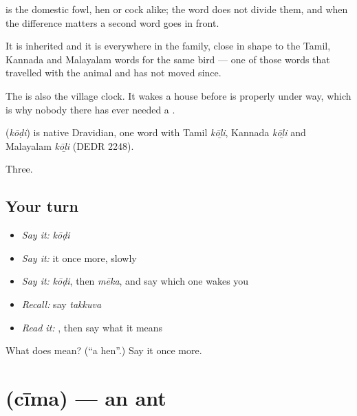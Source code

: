  is the domestic fowl, hen or cock alike; the word does not divide them, and when the difference matters a second word goes in front.

It is inherited and it is everywhere in the family, close in shape to the Tamil, Kannada and Malayalam words for the same bird — one of those words that travelled with the animal and has not moved since.

The  is also the village clock. It wakes a house before  is properly under way, which is why nobody there has ever needed a .

\begin{cousinweb}
\textbf{} (\emph{kōḍi}) is native Dravidian, one word with Tamil \emph{kōḻi}, Kannada \emph{kōḻi} and Malayalam \emph{kōḻi} (DEDR 2248).
\end{cousinweb}

\begin{grammarlens}[title={What you've built}]
Three.
\end{grammarlens}

\subsection*{Your turn}
\begin{itemize}
\raggedright
  \item \emph{Say it:} \emph{kōḍi}
  \item \emph{Say it:} it once more, slowly
  \item \emph{Say it:} \emph{kōḍi}, then \emph{mēka}, and say which one wakes you
  \item \emph{Recall:} say \emph{takkuva}
  \item \emph{Read it:} \textbf{}, then say what it means
\end{itemize}

\begin{tcolorbox}[breakable,colback=teal!4,colframe=teal!35!black,title={Before you move on}]
What does  mean? (\textquotedblleft{}a hen\textquotedblright{}.) Say it once more.
\end{tcolorbox}
\section[\texorpdfstring{\te{చీమ} (cīma)}{చీమ (cīma)}]{ (cīma) — an ant}

\label{lesson:TE-C60-ant}



